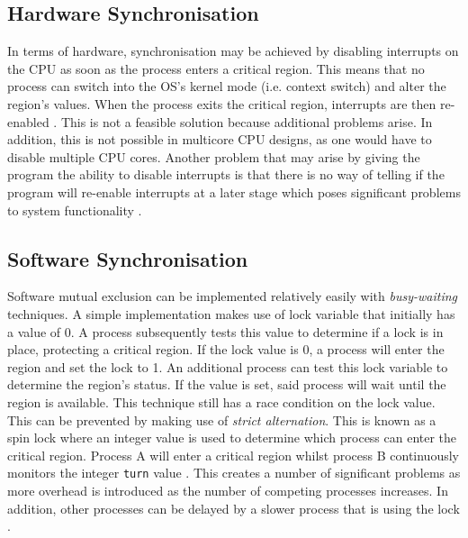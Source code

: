 \documentclass[12pt] {newrucsthesis}    %
\def\code#1{\texttt{#1}}
\begin{document}
      \subsection{Hardware Synchronisation}
        In terms of hardware, synchronisation may be achieved by disabling interrupts on the CPU as soon as the process
        enters a critical region. This means that no process can switch into the OS's kernel mode (i.e. context switch)
        and alter the region's values. When the process exits the critical region, interrupts are then re-enabled
        \citep{garg2005concurrent}. This is not a feasible solution because additional problems arise. In addition,
        this is not possible in multicore CPU designs, as one would have to disable multiple CPU cores. Another problem
        that may arise by giving the program the ability to disable interrupts is that there is no way of telling if the
        program will re-enable interrupts at a later stage which poses significant problems to system functionality \citep{modernOS}.

      \subsection{Software Synchronisation}
        Software mutual exclusion can be implemented relatively easily with \textit{busy-waiting} techniques. A
        simple implementation makes use of lock variable that initially has a value of 0. A process subsequently
        tests this value to determine if a lock is in place, protecting a critical region. If the lock value is 0,
        a process will enter the region and set the lock to 1. An additional process can test this lock variable to
        determine the region's status. If the value is set, said process will wait until the region is available.
        This technique still has a race condition on the lock value. This can be prevented by making use
        of \textit{strict alternation}. This is known as a spin lock where an integer value is used to determine
        which process can enter the critical region. Process A will enter a critical region whilst process B
        continuously monitors the integer \code{turn} value \citep{modernOS}. This creates a number of significant
        problems as more overhead is introduced as the number of competing processes increases. In addition,
        other processes can be delayed by a slower process that is using the lock \citep{spinlocks1994}.
\end{document}
